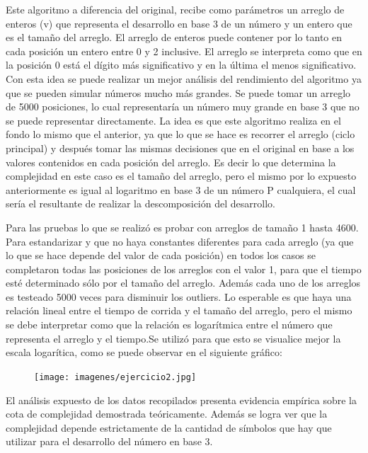 	Este algoritmo a diferencia del original, recibe como parámetros un arreglo de enteros (v) que representa el desarrollo en base 3 de un número y un entero que es el tamaño del arreglo. El arreglo de enteros puede contener por lo tanto en cada posición un entero entre 0 y 2 inclusive. El arreglo se interpreta como que en la posición 0 está el dígito más significativo y en la última el menos significativo.
	Con esta idea se puede realizar un mejor análisis del rendimiento del algoritmo ya que se pueden simular números mucho más grandes. Se puede tomar un arreglo de 5000 posiciones, lo cual representaría un número muy grande en base 3 que no se puede representar directamente. La idea es que este algoritmo realiza en el fondo lo mismo que el anterior, ya que lo que se hace es recorrer el arreglo (ciclo principal) y después tomar las mismas decisiones que en el original en base a los valores contenidos en cada posición del arreglo. Es decir lo que determina la complejidad en este caso es el tamaño del arreglo, pero el mismo por lo expuesto anteriormente es igual al logaritmo en base 3 de un número P cualquiera, el cual sería el resultante de realizar la descomposición del desarrollo.

	Para las pruebas lo que se realizó es probar con arreglos de tamaño 1 hasta 4600. Para estandarizar y que no haya constantes diferentes para cada arreglo (ya que lo que se hace depende del valor de cada posición) en todos los casos se completaron todas las posiciones de los arreglos con el valor 1, para que el tiempo esté determinado sólo por el tamaño del arreglo. Además cada uno de los arreglos es testeado 5000 veces para disminuir los outliers. Lo esperable es que haya una relación lineal entre el tiempo de corrida y el tamaño del arreglo, pero el mismo se debe interpretar como que la relación es logarítmica entre el número que representa el arreglo y el tiempo.Se utilizó para que esto se visualice mejor la escala logarítica, como se puede observar en el siguiente gráfico:  


    \renewcommand\constante{5}

	\begin{figure}[H]
      \begin{center}
        \texttt{[image: imagenes/ejercicio2.jpg]}
        \caption{}
      \end{center}
  \end{figure}

El análisis expuesto de los datos recopilados presenta evidencia empírica sobre la cota de complejidad
demostrada teóricamente. Además se logra ver que la complejidad depende estrictamente de la cantidad
de símbolos que hay que utilizar para el desarrollo del número en base 3.